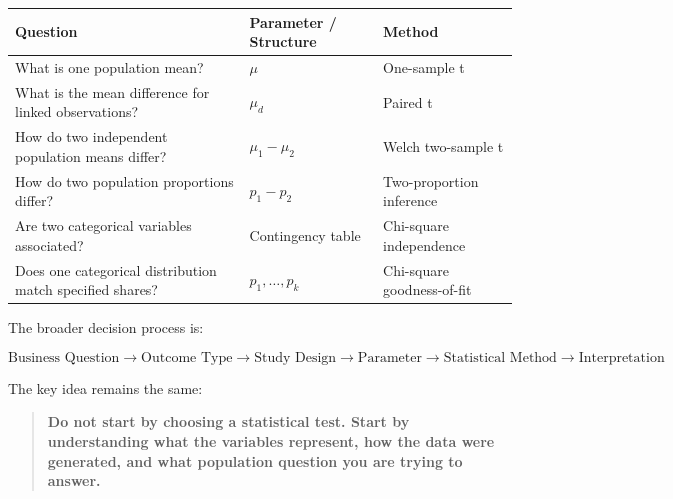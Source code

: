 \documentclass[
  letterpaper,
  DIV=11,
  numbers=noendperiod]{scrreprt}
\newcounter{none} %
\begin{document}
{\def\LTcaptype{none} %
\begin{longtable}[]{@{}
  >{\raggedright\arraybackslash}p{}
  >{\raggedright\arraybackslash}p{}
  >{\raggedright\arraybackslash}p{}@{}}
\toprule\noalign{}
\begin{minipage}[b]{\linewidth}\raggedright
Question
\end{minipage} & \begin{minipage}[b]{\linewidth}\raggedright
Parameter / Structure
\end{minipage} & \begin{minipage}[b]{\linewidth}\raggedright
Method
\end{minipage} \\
\midrule\noalign{}
\endhead
\bottomrule\noalign{}
\endlastfoot
What is one population mean? & \(\mu\) & One-sample t \\
What is the mean difference for linked observations? & \(\mu_d\) &
Paired t \\
How do two independent population means differ? & \(\mu_1-\mu_2\) &
Welch two-sample t \\
How do two population proportions differ? & \(p_1-p_2\) & Two-proportion
inference \\
Are two categorical variables associated? & Contingency table &
Chi-square independence \\
Does one categorical distribution match specified shares? &
\(p_1,\ldots,p_k\) & Chi-square goodness-of-fit \\
\end{longtable}
}

The broader decision process is:

\[
\boxed{
\text{Business Question}
\rightarrow
\text{Outcome Type}
\rightarrow
\text{Study Design}
\rightarrow
\text{Parameter}
\rightarrow
\text{Statistical Method}
\rightarrow
\text{Interpretation}
}
\]

The key idea remains the same:

\begin{quote}
\textbf{Do not start by choosing a statistical test. Start by
understanding what the variables represent, how the data were generated,
and what population question you are trying to answer.}
\end{quote}
\end{document}
